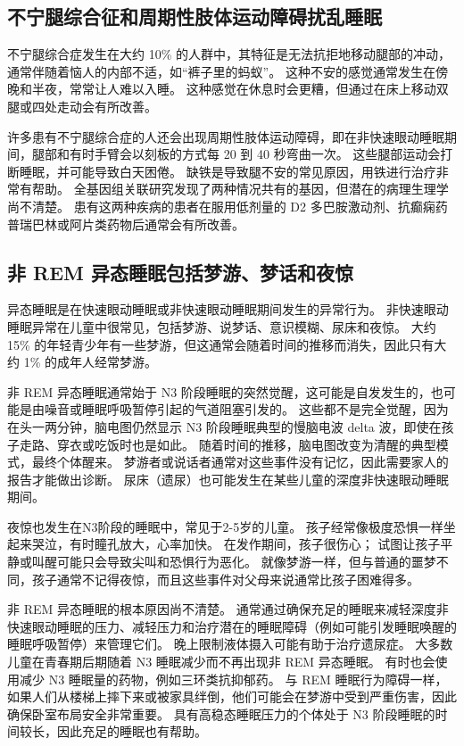 \subsection{不宁腿综合征和周期性肢体运动障碍扰乱睡眠}

不宁腿综合症发生在大约 10\% 的人群中，其特征是无法抗拒地移动腿部的冲动，通常伴随着恼人的内部不适，如“裤子里的蚂蚁”。
这种不安的感觉通常发生在傍晚和半夜，常常让人难以入睡。
这种感觉在休息时会更糟，但通过在床上移动双腿或四处走动会有所改善。


许多患有不宁腿综合症的人还会出现周期性肢体运动障碍，即在非快速眼动睡眠期间，腿部和有时手臂会以刻板的方式每 20 到 40 秒弯曲一次。
这些腿部运动会打断睡眠，并可能导致白天困倦。
缺铁是导致腿不安的常见原因，用铁进行治疗非常有帮助。
全基因组关联研究发现了两种情况共有的基因，但潜在的病理生理学尚不清楚。
患有这两种疾病的患者在服用低剂量的 D2 多巴胺激动剂、抗癫痫药普瑞巴林或阿片类药物后通常会有所改善。



\subsection{非 REM 异态睡眠包括梦游、梦话和夜惊}

异态睡眠是在快速眼动睡眠或非快速眼动睡眠期间发生的异常行为。
非快速眼动睡眠异常在儿童中很常见，包括梦游、说梦话、意识模糊、尿床和夜惊。
大约 15\% 的年轻青少年有一些梦游，但这通常会随着时间的推移而消失，因此只有大约 1\% 的成年人经常梦游。


非 REM 异态睡眠通常始于 N3 阶段睡眠的突然觉醒，这可能是自发发生的，也可能是由噪音或睡眠呼吸暂停引起的气道阻塞引发的。
这些都不是完全觉醒，因为在头一两分钟，脑电图仍然显示 N3 阶段睡眠典型的慢脑电波 delta 波，即使在孩子走路、穿衣或吃饭时也是如此。
随着时间的推移，脑电图改变为清醒的典型模式，最终个体醒来。
梦游者或说话者通常对这些事件没有记忆，因此需要家人的报告才能做出诊断。
尿床（遗尿）也可能发生在某些儿童的深度非快速眼动睡眠期间。


夜惊也发生在N3阶段的睡眠中，常见于2-5岁的儿童。
孩子经常像极度恐惧一样坐起来哭泣，有时瞳孔放大，心率加快。
在发作期间，孩子很伤心；
试图让孩子平静或叫醒可能只会导致尖叫和恐惧行为恶化。
就像梦游一样，但与普通的噩梦不同，孩子通常不记得夜惊，而且这些事件对父母来说通常比孩子困难得多。


非 REM 异态睡眠的根本原因尚不清楚。
通常通过确保充足的睡眠来减轻深度非快速眼动睡眠的压力、减轻压力和治疗潜在的睡眠障碍（例如可能引发睡眠唤醒的睡眠呼吸暂停）来管理它们。
晚上限制液体摄入可能有助于治疗遗尿症。
大多数儿童在青春期后期随着 N3 睡眠减少而不再出现非 REM 异态睡眠。
有时也会使用减少 N3 睡眠量的药物，例如三环类抗抑郁药。
与 REM 睡眠行为障碍一样，如果人们从楼梯上摔下来或被家具绊倒，他们可能会在梦游中受到严重伤害，因此确保卧室布局安全非常重要。
具有高稳态睡眠压力的个体处于 N3 阶段睡眠的时间较长，因此充足的睡眠也有帮助。



